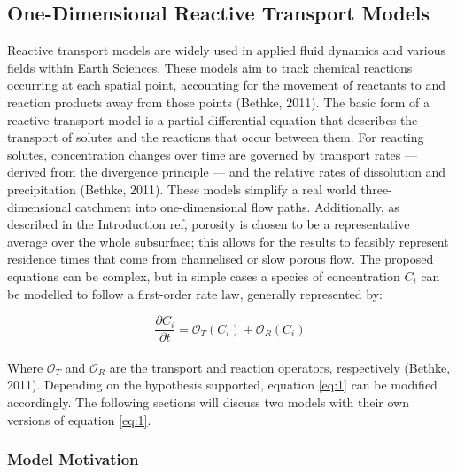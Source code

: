 \newpage


\subsection{One-Dimensional Reactive Transport Models}

Reactive transport models are widely used in applied fluid dynamics and various fields within Earth Sciences. These models aim to track chemical reactions occurring at each spatial point, accounting for the movement of reactants to and reaction products away from those points (Bethke, 2011). The basic form of a reactive transport model is a partial differential equation that describes the transport of solutes and the reactions that occur between them. For reacting solutes, concentration changes over time are governed by transport rates — derived from the divergence principle — and the relative rates of dissolution and precipitation (Bethke, 2011). These models simplify a real world three-dimensional catchment into one-dimensional flow paths. Additionally, as described in the Introduction ref, porosity is chosen to be a representative average over the whole subsurface; this allows for the results to feasibly represent residence times that come from channelised or slow porous flow. The proposed equations can be complex, but in simple cases a species of concentration $C_i$ can be modelled to follow a first-order rate law, generally represented by:

\begin{equation}
    \frac{\partial C_i}{\partial t} = \mathcal{O}_{T}(C_i) + \mathcal{O}_{R}(C_i)
    \label{eq:1}
\end{equation}\\


Where \(\mathcal{O}_{T}\) and \(\mathcal{O}_{R}\) are the transport and reaction operators, respectively (Bethke, 2011). Depending on the hypothesis supported, equation \ref{eq:1} can be modified accordingly. The following sections will discuss two models with their own versions of equation \ref{eq:1}.

\subsubsection*{Model Motivation}

